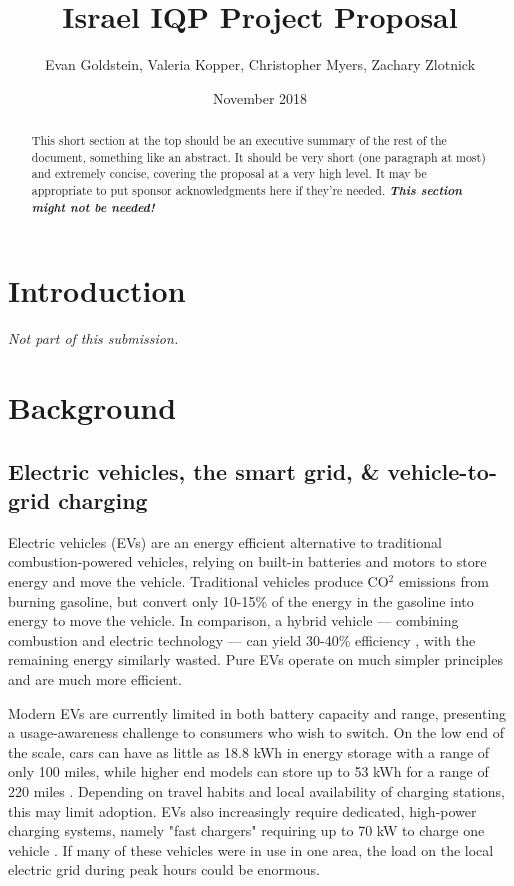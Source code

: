 \documentclass{article}                         %
\title{Israel IQP Project Proposal}
\author{Evan Goldstein, Valeria Kopper, Christopher Myers, Zachary Zlotnick}
\date{November 2018}
\begin{document}
\maketitle

\renewcommand\abstractname{Summary} %
\begin{abstract}
This short section at the top should be an executive summary of the rest of the document, something like an abstract. It should be very short (one paragraph at most) and extremely concise, covering the proposal at a very high level. It may be appropriate to put sponsor acknowledgments here if they're needed. \textbf{\textit{This section might not be needed!}}
\end{abstract}

\tableofcontents
\newpage
{}

\doublespacing

\section{Introduction}
\textit{Not part of this submission.}

\newpage
\section{Background}
\subsection{Electric vehicles, the smart grid, \& vehicle-to-grid charging}

Electric vehicles (EVs) are an energy efficient alternative to traditional combustion-powered vehicles, relying on built-in batteries and motors to store energy and move the vehicle. Traditional vehicles produce CO$^2$ emissions from burning gasoline, but convert only 10-15\% of the energy in the gasoline into energy to move the vehicle. In comparison, a hybrid vehicle --- combining combustion and electric technology --- can yield 30-40\% efficiency \cite{Zhu2015DistributedGrid}, with the remaining energy similarly wasted. Pure EVs operate on much simpler principles and are much more efficient.

Modern EVs are currently limited in both battery capacity and range, presenting a usage-awareness challenge to consumers who wish to switch. On the low end of the scale, cars can have as little as 18.8 kWh in energy storage with a range of only 100 miles, while higher end models can store up to 53 kWh for a range of 220 miles \cite{Ustun2015ImpactSystems}. Depending on travel habits and local availability of charging stations, this may limit adoption. EVs also increasingly require dedicated, high-power charging systems, namely "fast chargers" requiring up to 70 kW to charge one vehicle \cite{Ustun2015ImpactSystems}. If many of these vehicles were in use in one area, the load on the local electric grid during peak hours could be enormous.
\end{document}
